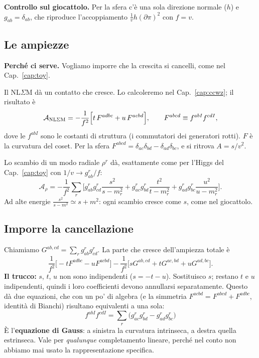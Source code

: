 \documentclass[11pt,a4paper]{article}
\numberwithin{equation}{section}
\theoremstyle{remark}
\begin{document}
\textbf{Controllo sul giocattolo.} Per la sfera c'è una sola direzione normale ($h$) e $g_{ab}=\delta_{ab}$, che riproduce l'accoppiamento $\frac1vh(\partial\pi)^2$ con $f=v$.

\subsection{Le ampiezze}

\textbf{Perché ci serve.} Vogliamo imporre che la crescita si cancelli, come nel Cap.~\ref{cap:toy}.

Il NL$\Sigma$M dà un contatto che cresce. Lo calcoleremo nel Cap.~\ref{cap:ccwz}; il risultato è
\begin{equation}
\mathcal A_{\rm NL\Sigma M}=-\frac{1}{f^2}\Big[t\,F^{adbc}+u\,F^{acbd}\Big],\qquad F^{abcd}\equiv f^{abI}f^{cdI},
\end{equation}
dove le $f^{abI}$ sono le costanti di struttura (i commutatori dei generatori rotti). $F$ è la curvatura del coset. Per la sfera $F^{abcd}=\delta_{ac}\delta_{bd}-\delta_{ad}\delta_{bc}$, e si ritrova $A=s/v^2$.

Lo scambio di un modo radiale $\rho^r$ dà, esattamente come per l'Higgs del Cap.~\ref{cap:toy} con $1/v\to g^r_{ab}/f$:
\[
\mathcal A_\rho=-\frac1{f^2}\sum_r\Big[g^r_{ab}g^r_{cd}\frac{s^2}{s-m_r^2}+g^r_{ac}g^r_{bd}\frac{t^2}{t-m_r^2}+g^r_{ad}g^r_{bc}\frac{u^2}{u-m_r^2}\Big].
\]
Ad alte energie $\frac{s^2}{s-m^2}\simeq s+m^2$: ogni scambio cresce come $s$, come nel giocattolo.

\subsection{Imporre la cancellazione}

Chiamiamo $G^{ab,cd}=\sum_rg^r_{ab}g^r_{cd}$. La parte che cresce dell'ampiezza totale è
\[
\frac{1}{f^2}\Big[-tF^{adbc}-uF^{acbd}\Big]-\frac1{f^2}\Big[sG^{ab,cd}+tG^{ac,bd}+uG^{ad,bc}\Big].
\]
\textbf{Il trucco:} $s$, $t$, $u$ non sono indipendenti ($s=-t-u$). Sostituisco $s$; restano $t$ e $u$ indipendenti, quindi i loro coefficienti devono annullarsi separatamente. Questo dà due equazioni, che con un po' di algebra (e la simmetria $F^{acbd}=F^{abcd}+F^{adbc}$, identità di Bianchi) risultano equivalenti a una sola:
\begin{equation}
\boxed{\;f^{abI}f^{cdI}=\sum_r\Big(g^r_{ac}g^r_{bd}-g^r_{ad}g^r_{bc}\Big)\;}
\label{eq:gauss}
\end{equation}
È l'\textbf{equazione di Gauss}: a sinistra la curvatura intrinseca, a destra quella estrinseca. Vale per \emph{qualunque} completamento lineare, perché nel conto non abbiamo mai usato la rappresentazione specifica.
\end{document}
